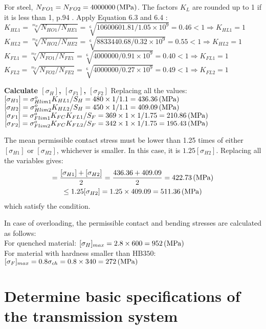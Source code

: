 For steel, $ N_{FO1}= N_{FO2}= 4000000\, (\mathrm{MPa})$. The factors $ K_L $ are rounded up to 1 if it is less than 1, p.94 \cite{tk1}. Apply Equation 6.3 and 6.4 \cite{tk1}:\\
$ K_{HL1} = \sqrt[m_H]{N_{HO1}/N_{HE1}} = \sqrt[6]{10600601.81/1.05 \times10^9} = 0.46 < 1 \Rightarrow K_{HL1} = 1$\\
$ K_{HL2} = \sqrt[m_H]{N_{HO2}/N_{HE2}} = \sqrt[6]{8833440.68/0.32 \times10^9} = 0.55 < 1 \Rightarrow K_{HL2} = 1$\\
$ K_{FL1} = \sqrt[m_F]{N_{FO1}/N_{FE1}} = \sqrt[6]{4000000/0.91 \times10^9} = 0.40 < 1 \Rightarrow K_{FL1} = 1$\\
$ K_{FL2} = \sqrt[m_F]{N_{FO2}/N_{FE2}} = \sqrt[6]{4000000/0.27 \times10^9} = 0.49 < 1 \Rightarrow K_{FL2} = 1$

\textbf{Calculate $ [\sigma_H] $, $ [\sigma_{F1}] $, $ [\sigma_{F2}] $} Replacing all the values:\\
$ [\sigma_{H1}] = \sigma_{Hlim1}^oK_{HL1}/S_H = 480\times 1/1.1 = 436.36 \, (\mathrm{MPa})$\\
$ [\sigma_{H2}] = \sigma_{Hlim2}^oK_{HL2}/S_H = 450\times 1/1.1 = 409.09 \, (\mathrm{MPa})$\\
$ [\sigma_{F1}] = \sigma_{Flim1}^oK_{FC}K_{FL1}/S_{F} = 369\times 1\times 1/1.75  = 210.86\, (\mathrm{MPa})$\\
$ [\sigma_{F2}] = \sigma_{Flim2}^oK_{FC}K_{FL2}/S_{F} = 342\times 1\times 1/1.75  = 195.43 \, (\mathrm{MPa})$

The mean permissible contact stress must be lower than 1.25 times of either $ [\sigma_{H1}] $ or $ [\sigma_{H2}] $, whichever is smaller. In this case, it is $ 1.25[\sigma_{H2}]$. Replacing all the variables gives:
\begin{multline*}
	[\sigma_H] =\dfrac{[\sigma_{H1}]+[\sigma_{H2}]}{2}= \dfrac{436.36+409.09}{2} = 422.73 \unitp{MPa}\\
	\leq 1.25[\sigma_{H2}] = 1.25\times 409.09= 511.36\unitp{MPa}
\end{multline*}
which satisfy the condition.

In case of overloading, the permissible contact and bending stresses are calculated as follows:\\
For quenched material: $ [\sigma_H]_{max} = 2.8\times 600 = 952\, (\mathrm{MPa}) $\\
For material with hardness smaller than $ \text{HB}350 $: $ [\sigma_F]_{max} = 0.8\sigma_{ch} = 0.8\times 340 = 272\, (\mathrm{MPa}) $

\section{Determine basic specifications of the transmission system}

